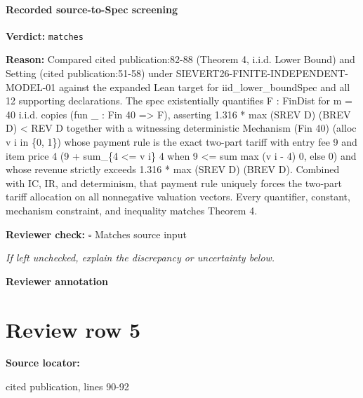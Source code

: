 \documentclass[10pt]{article}
\newcommand{\reviewerbox}{%
  \par\noindent\fbox{\parbox{0.96\linewidth}{\rule{0pt}{0.38in}}}\par
}
\newcommand{\reviewmatch}[1]{%
  \par\noindent\textbf{Reviewer check:} $\square$\; #1\par
  \noindent\emph{If left unchecked, explain the discrepancy or uncertainty below.}\par
}
\begin{document}
\paragraph{Recorded source-to-Spec screening}
\textbf{Verdict:} \texttt{matches}
\\
{\raggedright
\textbf{Reason:} Compared cited publication:\allowbreak{}82-\allowbreak{}88 (Theorem 4, i.\allowbreak{}i.\allowbreak{}d.\allowbreak{} Lower Bound) and Setting (cited publication:\allowbreak{}51-\allowbreak{}58) under SIEVERT26-\allowbreak{}FINITE-\allowbreak{}INDEPENDENT-\allowbreak{}MODEL-\allowbreak{}01 against the expanded Lean target for iid\_\allowbreak{}lower\_\allowbreak{}boundSpec and all 12 supporting declarations.\allowbreak{} The spec existentially quantifies F :\allowbreak{} FinDist for m = 40 i.\allowbreak{}i.\allowbreak{}d.\allowbreak{} copies (fun \_\allowbreak{} :\allowbreak{} Fin 40 => F), asserting 1.\allowbreak{}316 * max (SREV D) (BREV D) < REV D together with a witnessing deterministic Mechanism (Fin 40) (alloc v i in \{0, 1\}) whose payment rule is the exact two-\allowbreak{}part tariff with entry fee 9 and item price 4 (9 + sum\_\allowbreak{}\{4 <= v i\} 4 when 9 <= sum max (v i -\allowbreak{} 4) 0, else 0) and whose revenue strictly exceeds 1.\allowbreak{}316 * max (SREV D) (BREV D).\allowbreak{} Combined with IC, IR, and determinism, that payment rule uniquely forces the two-\allowbreak{}part tariff allocation on all nonnegative valuation vectors.\allowbreak{} Every quantifier, constant, mechanism constraint, and inequality matches Theorem 4.\allowbreak{}
\par}
\reviewmatch{Matches source input}
\noindent\textbf{Reviewer annotation}\par
\reviewerbox
\clearpage
\hypertarget{source-claim-0e5826d998ecffab}{}
\section*{Review row 5}
\textbf{Source locator:} {\footnotesize\raggedright cited publication, lines 90-\allowbreak{}92\par}
\end{document}
